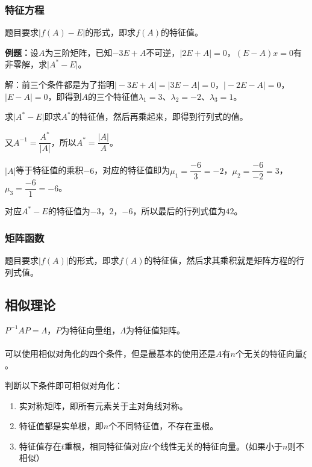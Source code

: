 \subsubsection{特征方程}

题目要求$\vert f(A)-E\vert$的形式，即求$f(A)$的特征值。

\textbf{例题：}设$A$为三阶矩阵，已知$-3E+A$不可逆，$\vert2E+A\vert=0$，$(E-A)x=0$有非零解，求$\vert A^*-E\vert$。

解：前三个条件都是为了指明$\vert-3E+A\vert=\vert3E-A\vert=0$，$\vert-2E-A\vert=0$，$\vert E-A\vert=0$，即得到$A$的三个特征值$\lambda_1=3$、$\lambda_2=-2$、$\lambda_3=1$。

求$\vert A^*-E\vert$即求$A^*$的特征值，然后再乘起来，即得到行列式的值。

又$A^{-1}=\dfrac{A^*}{\vert A\vert}$，所以$A^*=\dfrac{\vert A\vert}{A}$。

$\vert A\vert$等于特征值的乘积$-6$，对应的特征值即为$\mu_1=\dfrac{-6}{3}=-2$，$\mu_2=\dfrac{-6}{-2}=3$，$\mu_3=\dfrac{-6}{1}=-6$。

对应$A^*-E$的特征值为$-3$，$2$，$-6$，所以最后的行列式值为$42$。

\subsubsection{矩阵函数}

题目要求$\vert f(A)\vert$的形式，即求$f(A)$的特征值，然后求其乘积就是矩阵方程的行列式值。

\subsection{相似理论}

$P^{-1}AP=\Lambda$，$P$为特征向量组，$\Lambda$为特征值矩阵。

\paragraph{}

可以使用相似对角化的四个条件，但是最基本的使用还是$A$有$n$个无关的特征向量$\xi$。

判断以下条件即可相似对角化：

\begin{enumerate}
    \item 实对称矩阵，即所有元素关于主对角线对称。
    \item 特征值都是实单根，即$n$个不同特征值，不存在重根。
    \item 特征值存在$t$重根，相同特征值对应$t$个线性无关的特征向量。（如果小于$n$则不相似）
\end{enumerate}

